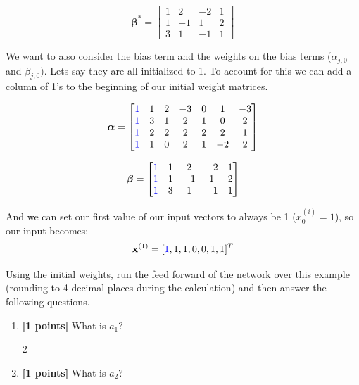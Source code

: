 \documentclass[11pt]{article}
\numberwithin{equation}{section} %
\numberwithin{figure}{section} %
\numberwithin{table}{section} %
\newcommand{\xv}{\mathbf{x}}
\newcommand{\points}[1]{{\bf [#1 points]}}
\begin{document}
\begin{enumerate}
\begin{center}
$$\boldsymbol{\beta^*}=
    \begin{bmatrix}
    1 & 2 & -2 & 1 \\
    1 & -1 & 1 & 2 \\
    3 & 1 & -1 & 1
    \end{bmatrix}
$$
\end{center}
    
We want to also consider the bias term and the weights on the bias terms (${\alpha}_{j,0}$ and ${\beta}_{j,0})$. Lets say they are all initialized to 1. To account for this we can add a column of 1's to the beginning of our initial weight matrices. 

$$\boldsymbol{\alpha}=
    \begin{bmatrix}
    \textcolor{blue}{1} & 1 & 2 & -3 & 0 & 1 & -3 \\
    \textcolor{blue}{1} & 3 & 1 & 2 & 1 & 0 & 2 \\
    \textcolor{blue}{1} & 2 & 2 & 2 & 2 & 2 & 1 \\
    \textcolor{blue}{1} & 1 & 0 & 2 & 1 & -2 & 2
    \end{bmatrix}$$
    
$$\boldsymbol{\beta}=
    \begin{bmatrix}
    \textcolor{blue}{1} & 1 & 2 & -2 & 1 \\
    \textcolor{blue}{1} & 1 & -1 & 1 & 2 \\
    \textcolor{blue}{1} & 3 & 1 & -1 & 1
    \end{bmatrix}
$$

    And we can set our first value of our input vectors to always be 1 ($x_0^{(i)} = 1$), so our input becomes: $$\xv^{(1)}=[\textcolor{blue}{1},1,1,0,0,1,1]^T$$
    
     Using the initial weights, run the feed forward of the network over this example (rounding to 4 decimal places during the calculation) and then answer the following questions. 

    
    \begin{enumerate}
        \item \points{1} What is $a_1$?
        
        \begin{tcolorbox}[fit,height=1cm, width=2cm, blank, borderline={1pt}{-2pt}]
            \begin{center}\huge2\end{center}
        \end{tcolorbox}
        
        
        \item \points{1} What is $a_2$?
        

\end{enumerate}
\end{enumerate}
\end{document}
